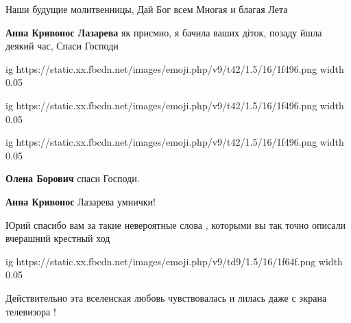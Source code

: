 \begin{itemize}
\begin{itemize}
Наши будущие молитвенницы, Дай Бог всем Многая и благая Лета

 
\textbf{Анна Кривонос Лазарева} як приємно, я бачила ваших діток, позаду йшла деякий час, Спаси Господи

\ifcmt
  ig https://static.xx.fbcdn.net/images/emoji.php/v9/t42/1.5/16/1f496.png
  width 0.05

  ig https://static.xx.fbcdn.net/images/emoji.php/v9/t42/1.5/16/1f496.png
  width 0.05

  ig https://static.xx.fbcdn.net/images/emoji.php/v9/t42/1.5/16/1f496.png
  width 0.05
\fi

 
\textbf{Олена Борович} спаси Господи.

 
\textbf{Анна Кривонос} Лазарева умнички!
\end{itemize}

 

Юрий спасибо вам за такие невероятные слова , которыми вы так точно описали
вчерашний крестный ход 

\ifcmt
  ig https://static.xx.fbcdn.net/images/emoji.php/v9/td9/1.5/16/1f64f.png
  width 0.05
\fi

Действительно эта вселенская любовь чувствовалась и лилась даже с экрана
телевизора !

 

\end{itemize}
